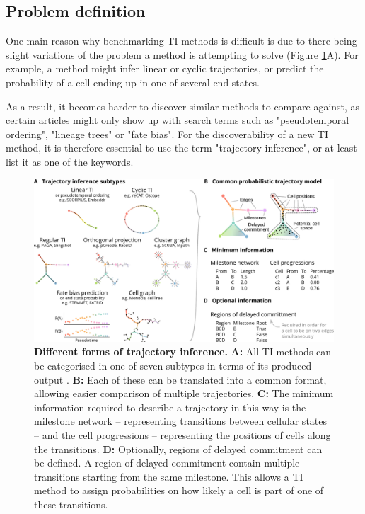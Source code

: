 \subsection{Problem definition}
One main reason why benchmarking TI methods is difficult is due to there being slight variations 
of the problem a method is attempting to solve (Figure \ref{fig:method_types}A). For example, a method might infer linear or cyclic trajectories, or predict the probability of a cell ending up in one of several end states.

As a result, it becomes harder to discover similar methods to compare against, as certain articles might only show up with search terms such as "pseudotemporal ordering", "lineage trees" or "fate bias". For the discoverability of a new TI method, it is therefore essential to use the term "trajectory inference", or at least list it as one of the keywords. 

\begin{figure}[htb!]
	\centering
	\includegraphics[width=\linewidth]{fig/method_types.pdf} 
	\caption{
		\textbf{Different forms of trajectory inference.}
		\textbf{A:} All TI methods can be categorised in one of seven subtypes in terms of its produced output \cite{saelens_comparisonsinglecelltrajectory_2019}.
		\textbf{B:} Each of these can be translated into a common format, allowing easier comparison of multiple trajectories.
		\textbf{C:} The minimum information required to describe a trajectory in this way is the milestone network -- representing transitions between cellular states -- and the cell progressions -- representing the positions of cells along the transitions.
		\textbf{D:} Optionally, regions of delayed commitment can be defined. A region of delayed commitment contain multiple transitions starting from the same milestone. This allows a TI method to assign probabilities on how likely a cell is part of one of these transitions.
	}
	\label{fig:method_types}
\end{figure}

